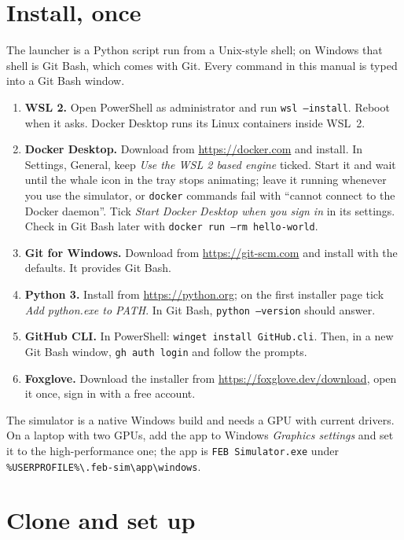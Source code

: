 
\section{Install, once}

The launcher is a Python script run from a Unix-style shell; on Windows that shell is Git Bash,
which comes with Git. Every command in this manual is typed into a Git Bash window.

\begin{enumerate}
  \item \textbf{WSL 2.} Open PowerShell as administrator and run \texttt{wsl --install}. Reboot
  when it asks. Docker Desktop runs its Linux containers inside WSL~2.
  \item \textbf{Docker Desktop.} Download from \url{https://docker.com} and install. In Settings,
  General, keep \emph{Use the WSL 2 based engine} ticked. Start it and wait until the whale icon in
  the tray stops animating; leave it running whenever you use the simulator, or \texttt{docker}
  commands fail with ``cannot connect to the Docker daemon''. Tick \emph{Start Docker Desktop when
  you sign in} in its settings. Check in Git Bash later with \texttt{docker run --rm hello-world}.
  \item \textbf{Git for Windows.} Download from \url{https://git-scm.com} and install with the
  defaults. It provides Git Bash.
  \item \textbf{Python 3.} Install from \url{https://python.org}; on the first installer page tick
  \emph{Add python.exe to PATH}. In Git Bash, \texttt{python --version} should answer.
  \item \textbf{GitHub CLI.} In PowerShell: \texttt{winget install GitHub.cli}. Then, in a new Git
  Bash window, \texttt{gh auth login} and follow the prompts.
  \item \textbf{Foxglove.} Download the installer from \url{https://foxglove.dev/download}, open it
  once, sign in with a free account.
\end{enumerate}

The simulator is a native Windows build and needs a GPU with current drivers. On a laptop with
two GPUs, add the app to Windows \emph{Graphics settings} and set it to the high-performance
one; the app is \texttt{FEB Simulator.exe} under
\texttt{\%USERPROFILE\%\textbackslash.feb-sim\textbackslash app\textbackslash windows}.

\section{Clone and set up}

